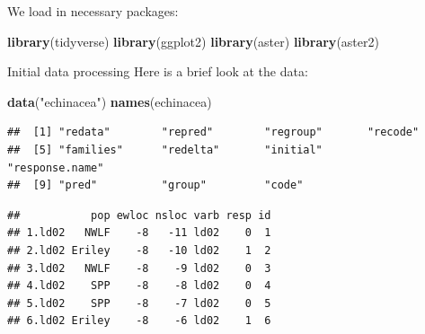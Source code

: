 \documentclass[
  ignorenonframetext,
]{beamer}
\newenvironment{Shaded}{\begin{snugshade}}{\end{snugshade}}
\newcommand{\FunctionTok}[1]{\textcolor[rgb]{0.13,0.29,0.53}{\textbf{#1}}}
\newcommand{\NormalTok}[1]{#1}
\newcommand{\SpecialCharTok}[1]{\textcolor[rgb]{0.81,0.36,0.00}{\textbf{#1}}}
\newcommand{\StringTok}[1]{\textcolor[rgb]{0.31,0.60,0.02}{#1}}
\begin{document}
\begin{frame}[fragile]{}
\protect\hypertarget{section-1}{}
We load in necessary packages:

\vspace{12pt}

\begin{Shaded}
\begin{Highlighting}[]
\FunctionTok{library}\NormalTok{(tidyverse)}
\FunctionTok{library}\NormalTok{(ggplot2)}
\FunctionTok{library}\NormalTok{(aster)}
\FunctionTok{library}\NormalTok{(aster2)}
\end{Highlighting}
\end{Shaded}
\end{frame}

\begin{frame}[fragile]{Initial data processing}
\protect\hypertarget{initial-data-processing}{}
Here is a brief look at the data:

\vspace{12pt}
\tiny

\begin{Shaded}
\begin{Highlighting}[]
\FunctionTok{data}\NormalTok{(}\StringTok{"echinacea"}\NormalTok{)}
\FunctionTok{names}\NormalTok{(echinacea)}
\end{Highlighting}
\end{Shaded}

\begin{verbatim}
##  [1] "redata"        "repred"        "regroup"       "recode"       
##  [5] "families"      "redelta"       "initial"       "response.name"
##  [9] "pred"          "group"         "code"
\end{verbatim}

\begin{Shaded}
\end{Shaded}

\begin{verbatim}
##           pop ewloc nsloc varb resp id
## 1.ld02   NWLF    -8   -11 ld02    0  1
## 2.ld02 Eriley    -8   -10 ld02    1  2
## 3.ld02   NWLF    -8    -9 ld02    0  3
## 4.ld02    SPP    -8    -8 ld02    0  4
## 5.ld02    SPP    -8    -7 ld02    0  5
## 6.ld02 Eriley    -8    -6 ld02    1  6
\end{verbatim}
\end{frame}
\end{document}

